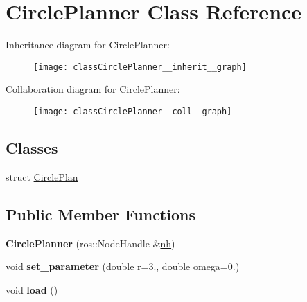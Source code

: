 \hypertarget{classCirclePlanner}{}\section{Circle\+Planner Class Reference}
\label{classCirclePlanner}


Inheritance diagram for Circle\+Planner\+:\nopagebreak
\begin{figure}[H]
\begin{center}
\leavevmode
\texttt{[image: classCirclePlanner\_\_inherit\_\_graph]}
\end{center}
\end{figure}


Collaboration diagram for Circle\+Planner\+:\nopagebreak
\begin{figure}[H]
\begin{center}
\leavevmode
\texttt{[image: classCirclePlanner\_\_coll\_\_graph]}
\end{center}
\end{figure}
\subsection*{Classes}
\begin{DoxyCompactItemize}
\item 
struct \hyperlink{structCirclePlanner_1_1CirclePlan}{Circle\+Plan}
\end{DoxyCompactItemize}
\subsection*{Public Member Functions}
\begin{DoxyCompactItemize}
\item 
{\bfseries Circle\+Planner} (ros\+::\+Node\+Handle \&\hyperlink{classPlanner_a9714d036f444a07ce90be8d135b9a40c}{nh})\hypertarget{classCirclePlanner_a33a27f97f5a1300d43c80b519fdfb3ef}{}\label{classCirclePlanner_a33a27f97f5a1300d43c80b519fdfb3ef}

\item 
void {\bfseries set\+\_\+parameter} (double r=3., double omega=0.)\hypertarget{classCirclePlanner_a21fef783d5f2252fd1b53d93e869fc65}{}\label{classCirclePlanner_a21fef783d5f2252fd1b53d93e869fc65}

\item 
void {\bfseries load} ()\hypertarget{classCirclePlanner_a1c14f6ed36cbd32d39d60ed312a65de8}{}\label{classCirclePlanner_a1c14f6ed36cbd32d39d60ed312a65de8}

\end{DoxyCompactItemize}
